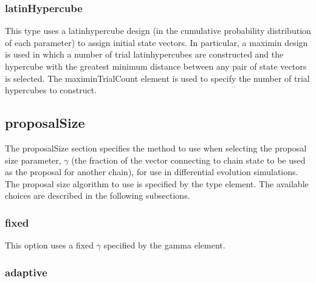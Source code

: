 \subsubsection{{\normalfont \ttfamily latinHypercube}}

This type uses a \gls{latinhypercube} design (in the cumulative probability distribution of each parameter) to assign initial state vectors. In particular, a \gls{maximin} design is used in which a number of trial \glspl{latinhypercube} are constructed and the hypercube with the greatest minimum distance between any pair of state vectors is selected. The {\normalfont \ttfamily maximinTrialCount} element is used to specify the number of trial hypercubes to construct.

\subsection{{\normalfont \ttfamily proposalSize}}

The {\normalfont \ttfamily proposalSize} section specifies the method to use when selecting the proposal size parameter, $\gamma$ (the fraction of the vector connecting to chain state to be used as the proposal for another chain), for use in differential evolution simulations. The proposal size algorithm to use is specified by the {\normalfont \ttfamily type} element. The available choices are described in the following subsections.

\subsubsection{{\normalfont \ttfamily fixed}}

This option uses a fixed $\gamma$ specified by the {\normalfont \ttfamily gamma} element.

\subsubsection{{\normalfont \ttfamily adaptive}}

